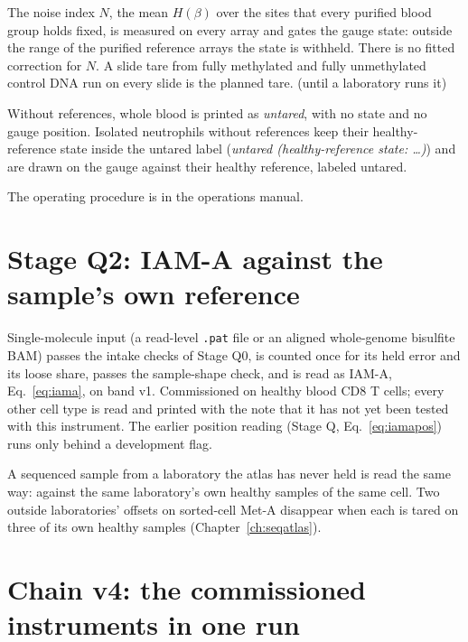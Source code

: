 The noise index $N$, the mean $H(\beta)$ over the sites that every purified blood group holds fixed, is measured on every array and gates the gauge
state: outside the range of the purified reference arrays the state is withheld.
There is no fitted correction for $N$. \calibrated{} A slide tare from fully methylated and fully unmethylated control DNA run on every slide is the planned tare.
\openprob{} (until a laboratory runs it)

Without references, whole blood is printed as \emph{untared}, with no state and no gauge position. Isolated neutrophils without references keep their healthy-reference
state inside the untared label (\emph{untared (healthy-reference state: \dots)}) and are drawn on the gauge against their healthy reference, labeled untared.

The operating procedure is in the operations manual.



\section{Stage Q2: IAM-A against the sample's own reference}

Single-molecule input (a read-level \texttt{.pat} file or an aligned whole-genome bisulfite BAM) passes the intake checks of Stage Q0,
is counted once for its held error and its loose share, passes the sample-shape check, and is read as IAM-A, Eq.~\eqref{eq:iama}, on
band v1. Commissioned on healthy blood CD8 T cells; every other cell type is read and printed with the note that it has not yet been tested with this instrument. The earlier position
reading (Stage Q, Eq.~\eqref{eq:iamapos}) runs only behind a development flag.

A sequenced sample from a laboratory the atlas has never held is read the same way: against the same laboratory's own healthy samples of the same
cell. Two outside laboratories' offsets on sorted-cell Met-A disappear when each is tared on three of its own healthy samples
(Chapter~\ref{ch:seqatlas}).

\section{Chain v4: the commissioned instruments in one run}

